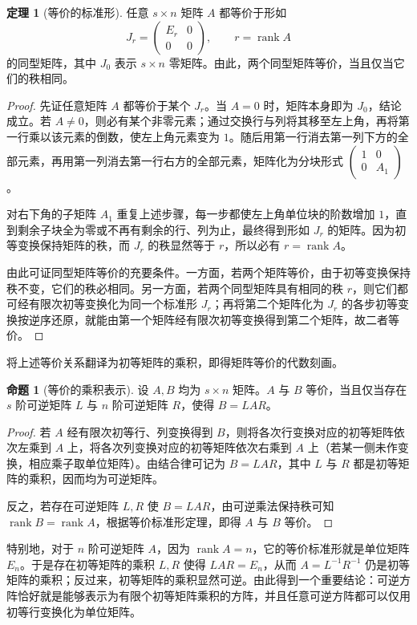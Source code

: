 \documentclass[UTF8, fontset=fandol, a4paper, 12pt]{ctexart}
\newcommand{\rank}{\operatorname{rank}}
\theoremstyle{definition}
\newtheorem{proposition}[definition]{命题}
\newtheorem{theorem}[definition]{定理}
\begin{document}
\begin{theorem}[等价的标准形]
任意 $s\times n$ 矩阵 $A$ 都等价于形如
\[
 J_r=\begin{pmatrix}E_r&0\\0&0\end{pmatrix},\qquad r=\rank A
\]
的同型矩阵，其中 $J_0$ 表示 $s\times n$ 零矩阵。由此，两个同型矩阵等价，当且仅当它们的秩相同。
\end{theorem}
\begin{proof}
先证任意矩阵 $A$ 都等价于某个 $J_r$。当 $A=0$ 时，矩阵本身即为 $J_0$，结论成立。若 $A\ne 0$，则必有某个非零元素；通过交换行与列将其移至左上角，再将第一行乘以该元素的倒数，使左上角元素变为 $1$。随后用第一行消去第一列下方的全部元素，再用第一列消去第一行右方的全部元素，矩阵化为分块形式 $\begin{pmatrix}1&0\\0&A_1\end{pmatrix}$。

对右下角的子矩阵 $A_1$ 重复上述步骤，每一步都使左上角单位块的阶数增加 $1$，直到剩余子块全为零或不再有剩余的行、列为止，最终得到形如 $J_r$ 的矩阵。因为初等变换保持矩阵的秩，而 $J_r$ 的秩显然等于 $r$，所以必有 $r=\rank A$。

由此可证同型矩阵等价的充要条件。一方面，若两个矩阵等价，由于初等变换保持秩不变，它们的秩必相同。另一方面，若两个同型矩阵具有相同的秩 $r$，则它们都可经有限次初等变换化为同一个标准形 $J_r$；再将第二个矩阵化为 $J_r$ 的各步初等变换按逆序还原，就能由第一个矩阵经有限次初等变换得到第二个矩阵，故二者等价。
\end{proof}

将上述等价关系翻译为初等矩阵的乘积，即得矩阵等价的代数刻画。

\begin{proposition}[等价的乘积表示]
设 $A,B$ 均为 $s\times n$ 矩阵。$A$ 与 $B$ 等价，当且仅当存在 $s$ 阶可逆矩阵 $L$ 与 $n$ 阶可逆矩阵 $R$，使得 $B=LAR$。
\end{proposition}
\begin{proof}
若 $A$ 经有限次初等行、列变换得到 $B$，则将各次行变换对应的初等矩阵依次左乘到 $A$ 上，将各次列变换对应的初等矩阵依次右乘到 $A$ 上（若某一侧未作变换，相应乘子取单位矩阵）。由结合律可记为 $B=LAR$，其中 $L$ 与 $R$ 都是初等矩阵的乘积，因而均为可逆矩阵。

反之，若存在可逆矩阵 $L,R$ 使 $B=LAR$，由可逆乘法保持秩可知 $\rank B=\rank A$，根据等价标准形定理，即得 $A$ 与 $B$ 等价。
\end{proof}

特别地，对于 $n$ 阶可逆矩阵 $A$，因为 $\rank A=n$，它的等价标准形就是单位矩阵 $E_n$。于是存在初等矩阵的乘积 $L,R$ 使得 $LAR=E_n$，从而 $A=L^{-1}R^{-1}$ 仍是初等矩阵的乘积；反过来，初等矩阵的乘积显然可逆。由此得到一个重要结论：可逆方阵恰好就是能够表示为有限个初等矩阵乘积的方阵，并且任意可逆方阵都可以仅用初等行变换化为单位矩阵。
\end{document}
